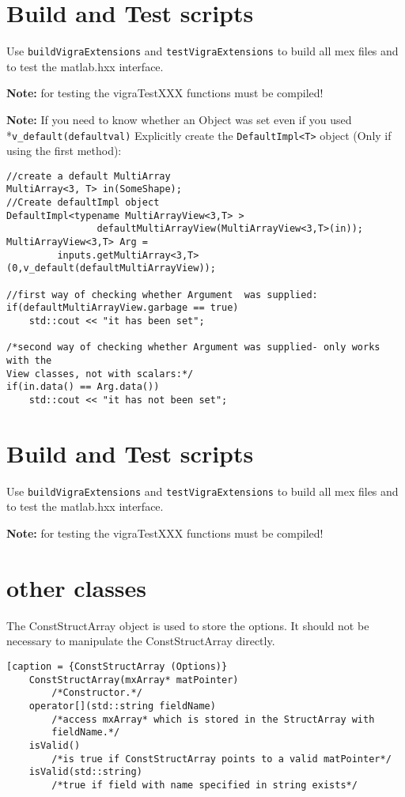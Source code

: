 \documentclass[a4paper,10pt]{article}
\begin{document}
\section{Build and Test scripts}
Use \verb+buildVigraExtensions+ and \verb+testVigraExtensions+ to build all mex files and to test the 
matlab.hxx interface.

\textbf{Note:} for testing the vigraTestXXX functions must be compiled!

\textbf{Note:} 	If you need to know whether an Object was set even if you used \\*\verb+v_default(defaultval)+
	Explicitly create the \verb+DefaultImpl<T>+ object (Only if using the first method):

\begin{lstlisting}[caption={Finding out whether a default object was set}]	
//create a default MultiArray
MultiArray<3, T> in(SomeShape);
//Create defaultImpl object
DefaultImpl<typename MultiArrayView<3,T> > 
				defaultMultiArrayView(MultiArrayView<3,T>(in));
MultiArrayView<3,T> Arg = 
		 inputs.getMultiArray<3,T>(0,v_default(defaultMultiArrayView));

//first way of checking whether Argument  was supplied:
if(defaultMultiArrayView.garbage == true) 
	std::cout << "it has been set";

/*second way of checking whether Argument was supplied- only works with the 
View classes, not with scalars:*/
if(in.data() == Arg.data()) 
	std::cout << "it has not been set";
\end{lstlisting}
\section{Build and Test scripts}
Use \verb+buildVigraExtensions+ and \verb+testVigraExtensions+ to build all mex files and to test the 
matlab.hxx interface.

\textbf{Note:} for testing the vigraTestXXX functions must be compiled!

\section{other classes}
The ConstStructArray object is used to store the options.
It should not be necessary to manipulate the ConstStructArray directly.
\begin{lstlisting}[caption = {ConstStructArray (Options)}
	ConstStructArray(mxArray* matPointer)
		/*Constructor.*/
	operator[](std::string fieldName)
		/*access mxArray* which is stored in the StructArray with 
		fieldName.*/
	isValid()
		/*is true if ConstStructArray points to a valid matPointer*/
	isValid(std::string)
		/*true if field with name specified in string exists*/
\end{lstlisting}
\end{document}
